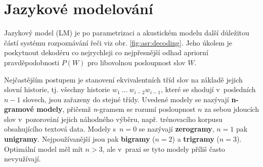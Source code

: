 \section{Jazykové modelování}
\label{chap:asr:language}

Jazykový model (LM) je po parametrizaci a akustickém modelu další důležitou částí systému rozpoznávání řeči viz obr. \ref{fig:asr:decoding}. Jeho úkolem je poskytnout dekodéru co nejrychleji co nejpřesnější odhad apriorní pravděpodobnosti $P\left(W\right)$ pro libovolnou posloupnost slov $W$.



Nejčastějším postupem je stanovení ekvivalentních tříd slov na základě jejich slovní historie, tj. všechny historie $w_1\ \dots\ w_{i-2}w_{i-1}$, které se shodují v~posledních $n-1$ slovech, jsou zařazeny do stejné třídy. Uvedené modely se nazývají \textbf{n-gramové modely}, přičemž \textit{n}-gramem se rozumí posloupnost $n$ za sebou jdoucích slov v~pozorování jejich náhodného výběru, např. trénovacího korpusu obsahujícího textová data. Modely s~$n=0$ se nazývají \textbf{zerogramy}, $n=1$ pak \textbf{unigramy}. Nejpoužívanější jsou pak \textbf{bigramy} ($n=2$) a \textbf{trigramy} ($n=3$).
Optimální model měl mít $n > 3$, ale v~praxi se tyto modely příliš často nevyužívají.


